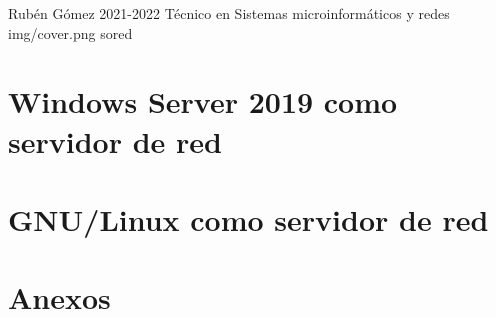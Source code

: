 \documentclass{../../../yukibook.cls/yukibook}
\begin{document}
  {Rubén Gómez}  %
  {2021-2022}    %
  {Técnico en Sistemas microinformáticos y redes} %
  {}	%
  {}	%
  {img/cover.png} %
  {sored} %

\part{Windows Server 2019 como servidor de red}
\graphicspath{{img/windows/}}


\part{GNU/Linux como servidor de red}
\graphicspath{{img/linux/}}


\part{Anexos}

\graphicspath{{../../../anexos/instalar_ubuntu_lts/}}


\graphicspath{{../../../anexos/ubuntu_raid1/}}


\graphicspath{{../../../anexos/sistemas_monitorizacion/}}


\graphicspath{{../../../anexos/monitorizacion_munin/}}


\graphicspath{{../../../anexos/}}

\end{document}
